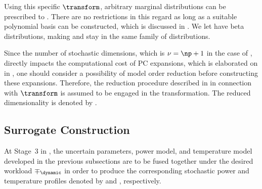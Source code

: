 Using this specific $\transform$, arbitrary marginal distributions can be
prescribed to \vz. There are no restrictions in this regard as long as a
suitable polynomial basis can be constructed, which is discussed in
. We let \vz have beta distributions, making \vu and
\vz stay in the same family of distributions.

Since the number of stochastic dimensions, which is $\nu = \np + 1$ in the case
of \vu, directly impacts the computational cost of \ac{PC} expansions, which is
elaborated on in , one should consider a possibility of
model order reduction before constructing these expansions. Therefore, the
reduction procedure described in  in connection
with $\transform$ is assumed to be engaged in the transformation. The reduced
dimensionality is denoted by \nz.

\subsection{Surrogate Construction}

At Stage~3 in , the uncertain parameters, power model, and
temperature model developed in the previous subsections are to be fused together
under the desired workload $\mp_\dynamic$ in order to produce the corresponding
stochastic power and temperature profiles denoted by \mp and \mq, respectively.

